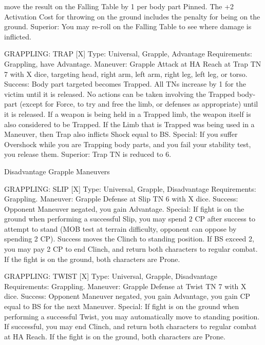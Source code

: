 \documentclass[oneside,11pt,english]{book}
\begin{document}
move the result on the Falling Table by 1 per body part Pinned. 
The +2 Activation Cost for throwing on the ground includes the penalty for being on the ground. 
Superior: You may re-roll on the Falling Table to see where damage is inflicted. 

 

GRAPPLING: TRAP [X] 
Type: Universal, Grapple, Advantage 
Requirements: Grappling, have Advantage. 
Maneuver: Grapple Attack at HA Reach at Trap TN 7 with X dice, targeting head, right arm, left arm, 
right leg, left leg, or torso. 
Success: Body part targeted becomes Trapped. All TNs increase by 1 for the victim until it is released. No 
actions can be taken involving the Trapped body-part (except for Force, to try and free the limb, or 
defenses as appropriate) until it is released. If a weapon is being held in a Trapped limb, the weapon itself 
is also considered to be Trapped. If the Limb that is Trapped was being used in a Maneuver, then Trap 
also inflicts Shock equal to BS. 
Special: If you suffer Overshock while you are Trapping body parts, and you fail your stability test, you 
release them. 
Superior: Trap TN is reduced to 6. 

 

 

Disadvantage Grapple Maneuvers 

 

GRAPPLING: SLIP [X] 
Type: Universal, Grapple, Disadvantage 
Requirements: Grappling. 
Maneuver: Grapple Defense at Slip TN 6 with X dice. 
Success: Opponent Maneuver negated, you gain Advantage. 
Special: If fight is on the ground when performing a successful Slip, you may spend 2 CP after success to 
attempt to stand (MOB test at terrain difficulty, opponent can oppose by spending 2 CP). Success moves 
the Clinch to standing position. 
If BS exceed 2, you may pay 2 CP to end Clinch, and return both characters to regular combat. If the fight 
is on the ground, both characters are Prone. 

 

GRAPPLING: TWIST [X] 
Type: Universal, Grapple, Disadvantage 
Requirements: Grappling. 
Maneuver: Grapple Defense at Twist TN 7 with X dice. 
Success: Opponent Maneuver negated, you gain Advantage, you gain CP equal to BS for the next 
Maneuver. 
Special: If fight is on the ground when performing a successful Twist, you may automatically move to 
standing position. 
If successful, you may end Clinch, and return both characters to regular combat at HA Reach. If the fight 
is on the ground, both characters are Prone. 
\end{document}
